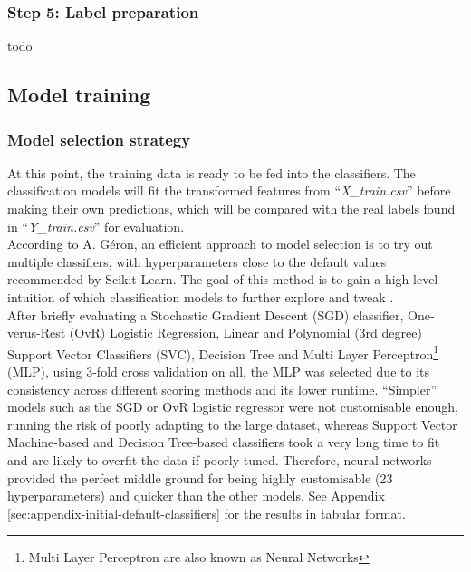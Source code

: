 \documentclass[letterpaper,12pt]{article}
\begin{document}
\subsubsection{Step 5: Label preparation}

todo


\subsection{Model training}

\subsubsection{Model selection strategy}

At this point, the training data is ready to be fed into the classifiers. The classification models will fit the transformed features from ``\textit{X\_train.csv}'' before making their own predictions, which will be compared with the real labels found in ``\textit{Y\_train.csv}'' for evaluation.\\

According to A. Géron, an efficient approach to model selection is to try out multiple classifiers, with hyperparameters close to the default values recommended by Scikit-Learn. The goal of this method is to gain a high-level intuition of which classification models to further explore and tweak \cite{Geron2019}.\\

After briefly evaluating a Stochastic Gradient Descent (SGD) classifier, One-verus-Rest (OvR) Logistic Regression, Linear and Polynomial (3rd degree) Support Vector Classifiers (SVC), Decision Tree and Multi Layer Perceptron\footnote{Multi Layer Perceptron are also known as Neural Networks} (MLP), using 3-fold cross validation on all, the MLP was selected due to its consistency across different scoring methods and its lower runtime. ``Simpler'' models such as the SGD or OvR logistic regressor were not customisable enough, running the risk of poorly adapting to the large dataset, whereas Support  Vector Machine-based and Decision Tree-based classifiers took a very long time to fit and  are likely to overfit the data if poorly tuned. Therefore, neural networks provided the perfect middle ground for being highly customisable (23 hyperparameters) and quicker than the other models. See Appendix \ref{sec:appendix-initial-default-classifiers} for the results in tabular format.
\end{document}
